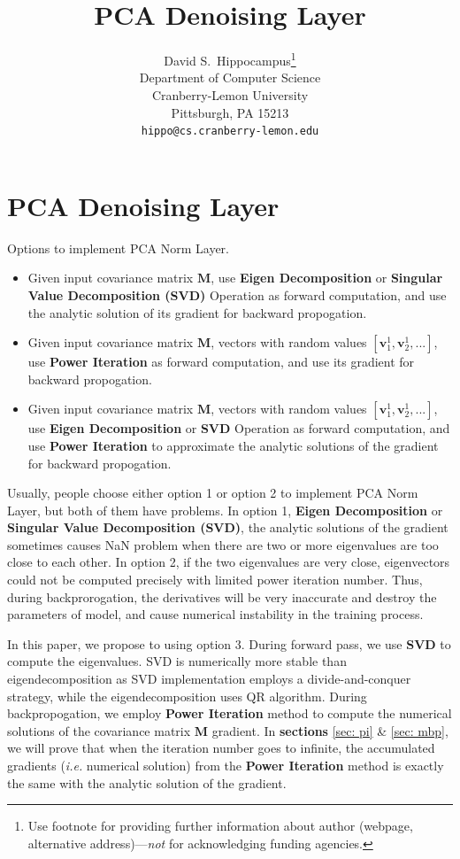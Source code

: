 \documentclass{article}
\title{PCA Denoising Layer}
\author{%
  David S.~Hippocampus\thanks{Use footnote for providing further information
    about author (webpage, alternative address)---\emph{not} for acknowledging
    funding agencies.} \\
  Department of Computer Science\\
  Cranberry-Lemon University\\
  Pittsburgh, PA 15213 \\
  \texttt{hippo@cs.cranberry-lemon.edu} \\
}
\newcommand{\bM}{\mathbf{M}}
\newcommand{\bv}{\mathbf{v}}
\begin{document}
\maketitle

\begin{abstract}

\end{abstract}

\section{PCA Denoising Layer}
Options to implement PCA Norm Layer.
\begin{itemize}
\item Given input covariance matrix $\bM$, use \textbf{Eigen Decomposition} or \textbf{Singular Value Decomposition (SVD)} Operation as forward computation, and use the analytic solution of its gradient for backward propogation.
\item Given input covariance matrix $\bM$, vectors with random values $[\bv_1^{1}, \bv_2^{1}, ...]$, use \textbf{Power Iteration} as forward computation, and use its gradient for backward propogation.
\item Given input covariance matrix $\bM$, vectors with random values $[\bv_1^{1}, \bv_2^{1}, ...]$, use \textbf{Eigen Decomposition} or \textbf{SVD} Operation as forward computation, and use \textbf{Power Iteration} to approximate the analytic solutions of the gradient for backward propogation.
\end{itemize}

Usually, people choose either option 1 or option 2 to implement PCA Norm Layer, but both of them have problems.
In option 1, \textbf{Eigen Decomposition} or \textbf{Singular Value Decomposition (SVD)}, the analytic solutions of the gradient sometimes causes NaN problem when there are two or more eigenvalues are too close to each other.
In option 2, if the two eigenvalues are very close, eigenvectors could not be computed precisely with limited power iteration number. Thus, during backprorogation, the derivatives will be very inaccurate and destroy the parameters of model, and cause numerical instability in the training process.

In this paper, we propose to using option 3. During forward pass, we use \textbf{SVD} to compute the eigenvalues. 
SVD is numerically more stable than eigendecomposition \cite{nakatsukasa2013stable} as SVD implementation employs a divide-and-conquer strategy, while the eigendecomposition uses QR algorithm. 
During backpropogation, we employ \textbf{Power Iteration} method to compute the numerical solutions of the covariance matrix $\bM$ gradient.
In \textbf{sections} \ref{sec: pi} \& \ref{sec: mbp}, we will prove that when the iteration number goes to infinite, the accumulated gradients (\emph{i.e.} numerical solution) from the \textbf{Power Iteration} method is exactly the same with the analytic solution of the gradient.
\end{document}
